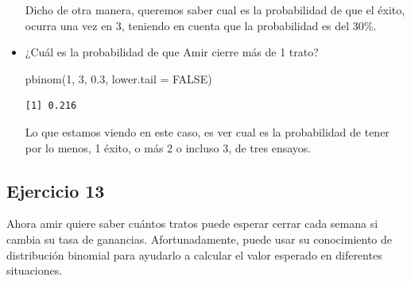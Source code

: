 \documentclass[
  letterpaper,
  DIV=11,
  numbers=noendperiod]{scrreprt}
\newenvironment{Shaded}{\begin{snugshade}}{\end{snugshade}}
\newcommand{\AttributeTok}[1]{\textcolor[rgb]{0.40,0.45,0.13}{#1}}
\newcommand{\ConstantTok}[1]{\textcolor[rgb]{0.56,0.35,0.01}{#1}}
\newcommand{\DecValTok}[1]{\textcolor[rgb]{0.68,0.00,0.00}{#1}}
\newcommand{\FloatTok}[1]{\textcolor[rgb]{0.68,0.00,0.00}{#1}}
\newcommand{\FunctionTok}[1]{\textcolor[rgb]{0.28,0.35,0.67}{#1}}
\newcommand{\NormalTok}[1]{\textcolor[rgb]{0.00,0.23,0.31}{#1}}
\begin{document}
\begin{itemize}
  Dicho de otra manera, queremos saber cual es la probabilidad de que el
  éxito, ocurra una vez en 3, teniendo en cuenta que la probabilidad es
  del 30\%.
\item
  ¿Cuál es la probabilidad de que Amir cierre más de 1 trato?

\begin{Shaded}
\begin{Highlighting}[]
\FunctionTok{pbinom}\NormalTok{(}\DecValTok{1}\NormalTok{, }\DecValTok{3}\NormalTok{, }\FloatTok{0.3}\NormalTok{, }\AttributeTok{lower.tail =} \ConstantTok{FALSE}\NormalTok{)}
\end{Highlighting}
\end{Shaded}

\begin{verbatim}
[1] 0.216
\end{verbatim}

  Lo que estamos viendo en este caso, es ver cual es la probabilidad de
  tener por lo menos, 1 éxito, o más 2 o incluso 3, de tres ensayos.
\end{itemize}

\hypertarget{ejercicio-13}{%
\subsection{Ejercicio 13}\label{ejercicio-13}}

Ahora amir quiere saber cuántos tratos puede esperar cerrar cada semana
si cambia su tasa de ganancias. Afortunadamente, puede usar su
conocimiento de distribución binomial para ayudarlo a calcular el valor
esperado en diferentes situaciones.
\end{document}

